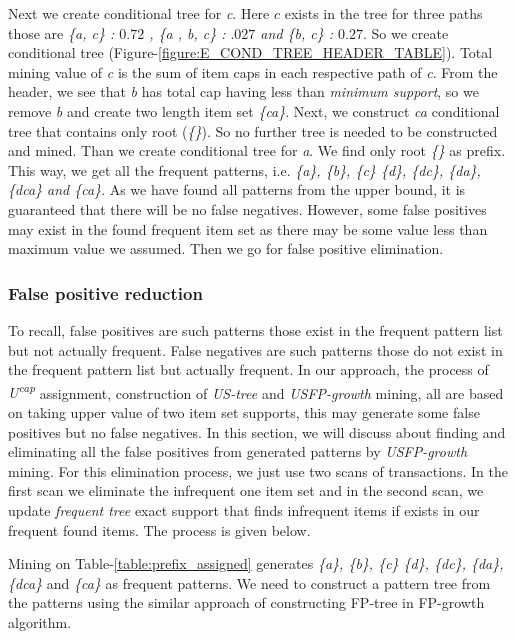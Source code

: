 \documentclass[conference]{IEEEtran}
\begin{document}
Next we create conditional tree for \emph{c}. Here $c$ exists in the tree for three paths those are \emph{\{a, c\} : $0.72$ , \{a , b, c\} : $.027$ and \{b, c\} : $0.27$}. So we create conditional tree (Figure-\ref{figure:E_COND_TREE_HEADER_TABLE}). Total mining value of \emph{c} is the sum of item caps in each respective path of \emph{c}. From the header, we see that \emph{b} has total cap having less than \emph{minimum support}, so we remove \emph{b} and create two length item set \emph{\{ca\}}. Next, we construct \emph{ca} conditional tree that contains only root (\emph{\{\}}). So no further tree is needed to be constructed and mined. Than we create conditional tree for \emph{a}. We find only root \emph{\{\}} as prefix. This way, we get all the frequent patterns, i.e. \emph{\{a\}, \{b\}, \{c\} \{d\}, \{dc\}, \{da\}, \{dca\} and \{ca\}}. As we have found all patterns from the upper bound, it is guaranteed that there will be no false negatives. However, some false positives may exist in the found frequent item set as there may be some value less than maximum value we assumed. Then we go for false positive elimination.
\subsubsection{False positive reduction}
    To recall, false positives are such patterns those exist in the frequent pattern list but not actually frequent. False negatives are such patterns those do not exist in the frequent pattern list but actually frequent. In our approach, the process of \emph{U\textsuperscript{cap}} assignment, construction of \emph{US-tree} and \emph{USFP-growth} mining, all are based on taking upper value of two item set supports, this may generate some false positives but no false negatives. In this section, we will discuss about finding and eliminating all the false positives from generated patterns by \emph{USFP-growth} mining. For this elimination process, we just use two scans of transactions. In the first scan we eliminate the infrequent one item set and in the second scan, we update \emph{frequent tree} exact support that finds infrequent items if exists in our frequent found items. The process is given below. 

Mining on Table-\ref{table:prefix_assigned} generates \emph{\{a\}, \{b\}, \{c\} \{d\}, \{dc\}, \{da\}, \{dca\}} and \emph{\{ca\}} as frequent patterns. We need to construct a pattern tree from the patterns using the similar approach of constructing FP-tree in FP-growth algorithm.
\end{document}
